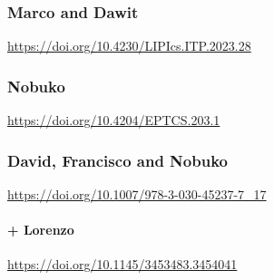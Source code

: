 \subsubsection{Marco and Dawit}
\cite{Tirore:2023} \url{https://doi.org/10.4230/LIPIcs.ITP.2023.28}

\subsubsection{Nobuko}
\cite{Orchard2016} \url{https://doi.org/10.4204/EPTCS.203.1}

\subsubsection{David, Francisco and Nobuko}
\cite{Castro2020} \url{https://doi.org/10.1007/978-3-030-45237-7_17}

\paragraph{+ Lorenzo}
\cite{Castro-Perez2021} \url{https://doi.org/10.1145/3453483.3454041}

